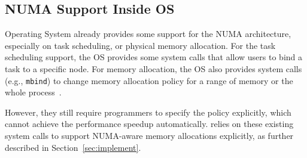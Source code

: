 \begin{comment}
\paragraph{Node Imbalance:} When some memory controllers have much more memory accesses than others, it may cause the node imbalance issue. Therefore, some tasks may wait more time for memory accesses, thwarting the whole progress of a multithreaded application.  

\paragraph{Interconnect Congestion:} Interconnect congestion occurs if some tasks are placed in remote nodes that may use the inter-node interconnection to access their memory. 

\paragraph{Remote Accesses:} In NUMA architecture, local nodes can be accessed with less latency than remote accesses. Therefore, it is important to reduce remote accesses to improve the performance.\\


 Based on the study~\cite{Blagodurov:2011:CNC:2002181.2002182}, node imbalance and interconnect congestion may have a larger performance impact than cache contention and remote accesses. These performance issues cannot be solved by the hardware automatically. Software support is required to control the placement of tasks, physical pages, and objects to achieve the optimal performance for multithreaded applications.  

	
\end{comment}

\subsection{NUMA Support Inside OS}
\label{sec:ossupport}
Operating System already provides some support for the NUMA architecture, especially on task scheduling, or physical memory allocation. For the task scheduling support, the OS provides some system calls that allow users to bind a task to a specific node. For memory allocation, the OS also provides system calls (e.g., \texttt{mbind}) to change memory allocation policy for a range of memory or the whole process~\cite{lameter2013numa, diener2015locality}. 

However, they still require programmers to specify the policy explicitly, which cannot achieve the performance speedup automatically. \NM{} relies on these existing system calls to support NUMA-aware memory allocations explicitly, as further described in Section~\ref{sec:implement}.

